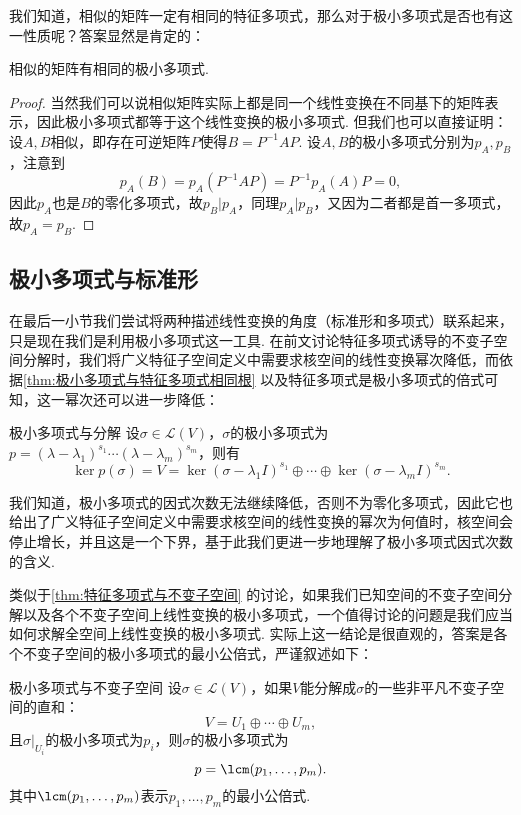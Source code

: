 我们知道，相似的矩阵一定有相同的特征多项式，那么对于极小多项式是否也有这一性质呢？答案显然是肯定的：
\begin{theorem}{}{}
    相似的矩阵有相同的极小多项式.
\end{theorem}
\begin{proof}
    当然我们可以说相似矩阵实际上都是同一个线性变换在不同基下的矩阵表示，因此极小多项式都等于这个线性变换的极小多项式. 但我们也可以直接证明：设$A,B$相似，即存在可逆矩阵$P$使得$B=P^{-1}AP$. 设$A,B$的极小多项式分别为$p_A,p_B$，注意到
    \[p_A(B)=p_A(P^{-1}AP)=P^{-1}p_A(A)P=0,\]
    因此$p_A$也是$B$的零化多项式，故$p_B\vert p_A$，同理$p_A\vert p_B$，又因为二者都是首一多项式，故$p_A=p_B$.
\end{proof}

\subsection{极小多项式与标准形}

在最后一小节我们尝试将两种描述线性变换的角度（标准形和多项式）联系起来，只是现在我们是利用极小多项式这一工具. 在前文讨论特征多项式诱导的不变子空间分解时，我们将广义特征子空间定义中需要求核空间的线性变换幂次降低，而依据\autoref{thm:极小多项式与特征多项式相同根} 以及特征多项式是极小多项式的倍式可知，这一幂次还可以进一步降低：
\begin{theorem}{}{极小多项式与分解}
    设$\sigma\in \mathcal{L}(V)$，$\sigma$的极小多项式为$p=(\lambda-\lambda_1)^{s_1}\cdots(\lambda-\lambda_m)^{s_m}$，则有
    \[\ker p(\sigma)=V=\ker (\sigma-\lambda_1I)^{s_1}\oplus\cdots\oplus\ker (\sigma-\lambda_mI)^{s_m}.\]
\end{theorem}

我们知道，极小多项式的因式次数无法继续降低，否则不为零化多项式，因此它也给出了广义特征子空间定义中需要求核空间的线性变换的幂次为何值时，核空间会停止增长，并且这是一个下界，基于此我们更进一步地理解了极小多项式因式次数的含义.

类似于\autoref{thm:特征多项式与不变子空间} 的讨论，如果我们已知空间的不变子空间分解以及各个不变子空间上线性变换的极小多项式，一个值得讨论的问题是我们应当如何求解全空间上线性变换的极小多项式. 实际上这一结论是很直观的，答案是各个不变子空间的极小多项式的最小公倍式，严谨叙述如下：
\begin{theorem}{}{极小多项式与不变子空间}
    设$\sigma\in\mathcal{L}(V)$，如果$V$能分解成$\sigma$的一些非平凡不变子空间的直和：
    \[V=U_1\oplus\cdots\oplus U_m,\]
    且$\sigma\vert_{U_i}$的极小多项式为$p_i$，则$\sigma$的极小多项式为
    \[p=\lcm(p_1,\ldots,p_m).\]
    其中$\lcm(p_1,\ldots,p_m)$表示$p_1,\ldots,p_m$的最小公倍式.
\end{theorem}

